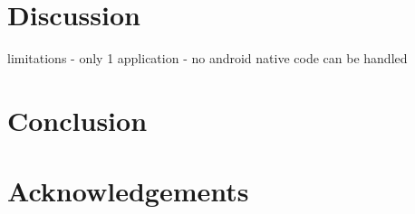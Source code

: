 \documentclass{acm_proc_article-sp}
\begin{document}
\section{Discussion}


limitations
- only 1 application
- no android native code can be handled

\section{Conclusion}






\section{Acknowledgements}

%

% 
\end{document}
